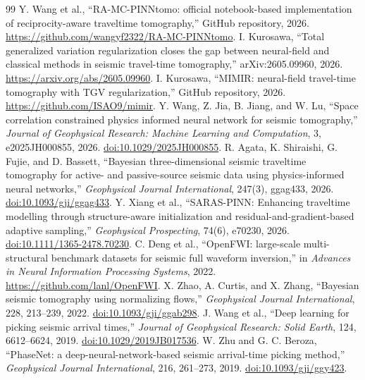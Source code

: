 \documentclass[11pt]{article}
\begin{document}
\begin{thebibliography}{99}
 Y. Wang et al., ``RA-MC-PINNtomo: official notebook-based implementation of reciprocity-aware traveltime tomography,'' GitHub repository, 2026. \url{https://github.com/wangyf2322/RA-MC-PINNtomo}.
 I. Kurosawa, ``Total generalized variation regularization closes the gap between neural-field and classical methods in seismic travel-time tomography,'' arXiv:2605.09960, 2026. \url{https://arxiv.org/abs/2605.09960}.
 I. Kurosawa, ``MIMIR: neural-field travel-time tomography with TGV regularization,'' GitHub repository, 2026. \url{https://github.com/ISAO9/mimir}.
 Y. Wang, Z. Jia, B. Jiang, and W. Lu, ``Space correlation constrained physics informed neural network for seismic tomography,'' \emph{Journal of Geophysical Research: Machine Learning and Computation}, 3, e2025JH000855, 2026. \href{https://doi.org/10.1029/2025JH000855}{doi:10.1029/2025JH000855}.
 R. Agata, K. Shiraishi, G. Fujie, and D. Bassett, ``Bayesian three-dimensional seismic traveltime tomography for active- and passive-source seismic data using physics-informed neural networks,'' \emph{Geophysical Journal International}, 247(3), ggag433, 2026. \href{https://doi.org/10.1093/gji/ggag433}{doi:10.1093/gji/ggag433}.
 Y. Xiang et al., ``SARAS-PINN: Enhancing traveltime modelling through structure-aware initialization and residual-and-gradient-based adaptive sampling,'' \emph{Geophysical Prospecting}, 74(6), e70230, 2026. \href{https://doi.org/10.1111/1365-2478.70230}{doi:10.1111/1365-2478.70230}.
 C. Deng et al., ``OpenFWI: large-scale multi-structural benchmark datasets for seismic full waveform inversion,'' in \emph{Advances in Neural Information Processing Systems}, 2022. \url{https://github.com/lanl/OpenFWI}.
 X. Zhao, A. Curtis, and X. Zhang, ``Bayesian seismic tomography using normalizing flows,'' \emph{Geophysical Journal International}, 228, 213--239, 2022. \href{https://doi.org/10.1093/gji/ggab298}{doi:10.1093/gji/ggab298}.
 J. Wang et al., ``Deep learning for picking seismic arrival times,'' \emph{Journal of Geophysical Research: Solid Earth}, 124, 6612--6624, 2019. \href{https://doi.org/10.1029/2019JB017536}{doi:10.1029/2019JB017536}.
 W. Zhu and G. C. Beroza, ``PhaseNet: a deep-neural-network-based seismic arrival-time picking method,'' \emph{Geophysical Journal International}, 216, 261--273, 2019. \href{https://doi.org/10.1093/gji/ggy423}{doi:10.1093/gji/ggy423}.

\end{thebibliography}
\end{document}
